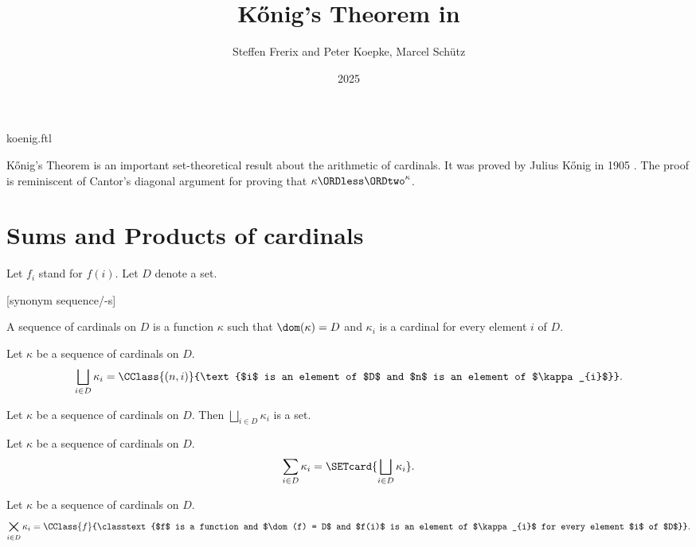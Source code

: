 \documentclass{stex}
\title{Kőnig's Theorem in \Naproche}
\author{Steffen Frerix and Peter Koepke, Marcel Schütz}
\date{2025}
\newcommand{\SumSet}[2]{\bigsqcup_{i \in #2} #1_{i}}
\newcommand{\Sum}[2]{\sum_{i \in #2} #1_{i}}
\newcommand{\ProdSet}[2]{\bigtimes_{i \in #2} #1_{i}}
\begin{document}
\begin{smodule}{koenig.ftl}
\maketitle


\noindent Kőnig's Theorem is an important set-theoretical result about the
arithmetic of cardinals.
It was proved by Julius Kőnig in 1905 \cite[p. 177--180]{Koenig1905}.
The proof is reminiscent of Cantor's diagonal argument for proving that
$\kappa \ORDless \ORDtwo^\kappa$.


\section*{Sums and Products of cardinals}

\begin{forthel}
  Let $f_{i}$ stand for $f(i)$.
  Let $D$ denote a set.

  [synonym sequence/-s]

  \begin{definition*}
    A sequence of cardinals on $D$ is a function $\kappa$ such that
    $\dom(\kappa) = D$ and $\kappa_{i}$ is a cardinal for every element $i$ of $D$.
  \end{definition*}

  \begin{definition*}
    Let $\kappa$ be a sequence of cardinals on $D$.
    \[ \SumSet{\kappa}{D} = \CClass{(n,i)}{\text{$i$ is an element of $D$ and $n$ is an element of $\kappa_{i}$}}. \]
  \end{definition*}

  \begin{axiom*}
    Let $\kappa$ be a sequence of cardinals on $D$.
    Then $\SumSet{\kappa}{D}$ is a set.
  \end{axiom*}

  \begin{definition*}
    Let $\kappa$ be a sequence of cardinals on $D$.
    \[ \Sum{\kappa}{D} = \SETcard{ \SumSet{\kappa}{D} }. \]
  \end{definition*}

  \begin{definition*}
    Let $\kappa$ be a sequence of cardinals on $D$.
    \[ \ProdSet{\kappa}{D} = \CClass{f}{\classtext{$f$ is a function and $\dom(f) = D$ and $f(i)$ is an element of $\kappa_{i}$ for every element $i$ of $D$}}. \]
  \end{definition*}


\end{forthel}
\end{smodule}
\end{document}

